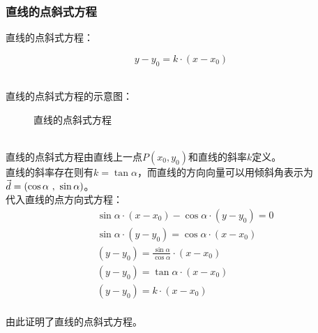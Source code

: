 \documentclass[UTF8]{ctexart}
\let\nvec\vec
\def\vec#1{\nvec{\vphantom b\smash{#1}}}
\begin{document}
\newpage

\subsubsection{直线的点斜式方程}
    \setcounter{equation}{0}
    直线的点斜式方程：
    \begin{large}
        \begin{equation*}
            y-y_0=k\cdot(x-x_0)
        \end{equation*}
    \end{large}\\
    直线的点斜式方程的示意图：
    \begin{figure}[h]
        \begin{center}
            \caption{直线的点斜式方程}
        \end{center}
    \end{figure}\\
    直线的点斜式方程由直线上一点$P(x_0,y_0)$和直线的斜率$k$定义。\\[3mm]
    直线的斜率存在则有$k=\tan{\alpha}$，而直线的方向向量可以用倾斜角表示为$\vec{d}=(\cos{\alpha}~,~\sin{\alpha})$。\\[6mm]
    代入直线的点方向式方程：
    \begin{align}
        &\sin{\alpha}\cdot(x-x_0)-\cos{\alpha}\cdot(y-y_0)=0\\[3mm]
        &\sin{\alpha}\cdot(y-y_0)=\cos{\alpha}\cdot(x-x_0)\\[3mm]
        &(y-y_0)=\frac{\sin{\alpha}}{\cos{\alpha}}\cdot(x-x_0)\\[3mm]
        &(y-y_0)=\tan{\alpha}\cdot(x-x_0)\\[3mm]
        &(y-y_0)=k\cdot(x-x_0)
    \end{align}\\
    由此证明了直线的点斜式方程。
\end{document}
